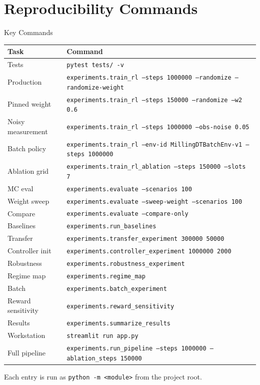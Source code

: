\documentclass[11pt,aspectratio=169]{beamer}
\begin{document}
\appendix
\section{Reproducibility Commands}

\begin{frame}{Key Commands}
    \scriptsize
    \begin{tabular}{@{}ll@{}}
    \toprule
    \textbf{Task} & \textbf{Command} \\
    \midrule
    Tests & \texttt{pytest tests/ -v} \\
    Production & \texttt{experiments.train\_rl --steps 1000000 --randomize --randomize-weight} \\
    Pinned weight & \texttt{experiments.train\_rl --steps 150000 --randomize --w2 0.6} \\
    Noisy measurement & \texttt{experiments.train\_rl --steps 1000000 --obs-noise 0.05} \\
    Batch policy & \texttt{experiments.train\_rl --env-id MillingDTBatchEnv-v1 --steps 1000000} \\
    Ablation grid & \texttt{experiments.train\_rl\_ablation --steps 150000 --slots 7} \\
    MC eval & \texttt{experiments.evaluate --scenarios 100} \\
    Weight sweep & \texttt{experiments.evaluate --sweep-weight --scenarios 100} \\
    Compare & \texttt{experiments.evaluate --compare-only} \\
    Baselines & \texttt{experiments.run\_baselines} \\
    Transfer & \texttt{experiments.transfer\_experiment 300000 50000} \\
    Controller init & \texttt{experiments.controller\_experiment 1000000 2000} \\
    Robustness & \texttt{experiments.robustness\_experiment} \\
    Regime map & \texttt{experiments.regime\_map} \\
    Batch & \texttt{experiments.batch\_experiment} \\
    Reward sensitivity & \texttt{experiments.reward\_sensitivity} \\
    Results & \texttt{experiments.summarize\_results} \\
    Workstation & \texttt{streamlit run app.py} \\
    Full pipeline & \texttt{experiments.run\_pipeline --steps 1000000 --ablation\_steps 150000} \\
    \bottomrule
    \end{tabular}

    {\footnotesize Each entry is run as \texttt{python -m <module>} from the project root.}
\end{frame}
\end{document}
